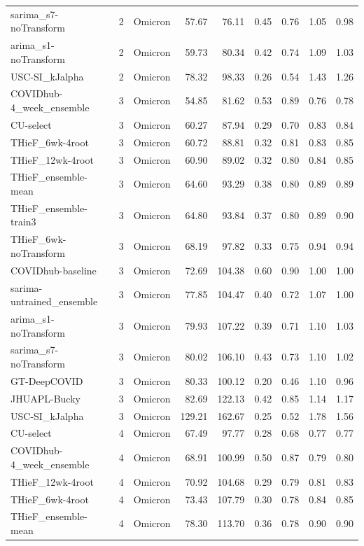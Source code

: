 \documentclass[12pt]{article}
\begin{document}
\begin{longtable}{lrlrrrrrr}
  sarima\_s7-noTransform & 2 & Omicron & 57.67 & 76.11 & 0.45 & 0.76 & 1.05 & 0.98 \\ 
  arima\_s1-noTransform & 2 & Omicron & 59.73 & 80.34 & 0.42 & 0.74 & 1.09 & 1.03 \\ 
  USC-SI\_kJalpha & 2 & Omicron & 78.32 & 98.33 & 0.26 & 0.54 & 1.43 & 1.26 \\ 
  COVIDhub-4\_week\_ensemble & 3 & Omicron & 54.85 & 81.62 & 0.53 & 0.89 & 0.76 & 0.78 \\ 
  CU-select & 3 & Omicron & 60.27 & 87.94 & 0.29 & 0.70 & 0.83 & 0.84 \\ 
  THieF\_6wk-4root & 3 & Omicron & 60.72 & 88.81 & 0.32 & 0.81 & 0.83 & 0.85 \\ 
  THieF\_12wk-4root & 3 & Omicron & 60.90 & 89.02 & 0.32 & 0.80 & 0.84 & 0.85 \\ 
  THieF\_ensemble-mean & 3 & Omicron & 64.60 & 93.29 & 0.38 & 0.80 & 0.89 & 0.89 \\ 
  THieF\_ensemble-train3 & 3 & Omicron & 64.80 & 93.84 & 0.37 & 0.80 & 0.89 & 0.90 \\ 
  THieF\_6wk-noTransform & 3 & Omicron & 68.19 & 97.82 & 0.33 & 0.75 & 0.94 & 0.94 \\ 
  COVIDhub-baseline & 3 & Omicron & 72.69 & 104.38 & 0.60 & 0.90 & 1.00 & 1.00 \\ 
  sarima-untrained\_ensemble & 3 & Omicron & 77.85 & 104.47 & 0.40 & 0.72 & 1.07 & 1.00 \\ 
  arima\_s1-noTransform & 3 & Omicron & 79.93 & 107.22 & 0.39 & 0.71 & 1.10 & 1.03 \\ 
  sarima\_s7-noTransform & 3 & Omicron & 80.02 & 106.10 & 0.43 & 0.73 & 1.10 & 1.02 \\ 
  GT-DeepCOVID & 3 & Omicron & 80.33 & 100.12 & 0.20 & 0.46 & 1.10 & 0.96 \\ 
  JHUAPL-Bucky & 3 & Omicron & 82.69 & 122.13 & 0.42 & 0.85 & 1.14 & 1.17 \\ 
  USC-SI\_kJalpha & 3 & Omicron & 129.21 & 162.67 & 0.25 & 0.52 & 1.78 & 1.56 \\ 
  CU-select & 4 & Omicron & 67.49 & 97.77 & 0.28 & 0.68 & 0.77 & 0.77 \\ 
  COVIDhub-4\_week\_ensemble & 4 & Omicron & 68.91 & 100.99 & 0.50 & 0.87 & 0.79 & 0.80 \\ 
  THieF\_12wk-4root & 4 & Omicron & 70.92 & 104.68 & 0.29 & 0.79 & 0.81 & 0.83 \\ 
  THieF\_6wk-4root & 4 & Omicron & 73.43 & 107.79 & 0.30 & 0.78 & 0.84 & 0.85 \\ 
  THieF\_ensemble-mean & 4 & Omicron & 78.30 & 113.70 & 0.36 & 0.78 & 0.90 & 0.90 \\ 

\end{longtable}
\end{document}

